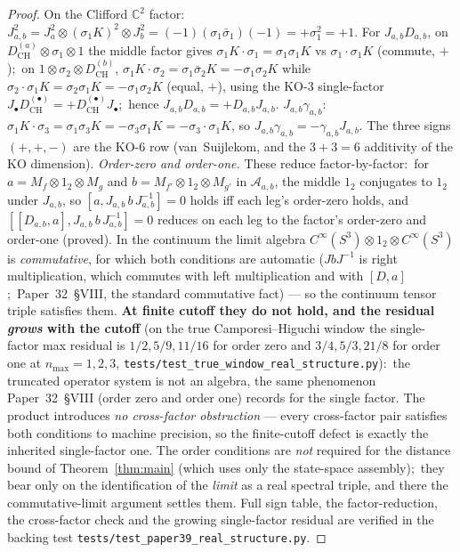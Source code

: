 \documentclass[11pt,a4paper]{article}
\theoremstyle{plain}
\theoremstyle{definition}
\newcommand{\nmax}{n_{\max}}
\newcommand{\sthree}{S^{3}}
\newcommand{\Acal}{\mathcal{A}}
\newcommand{\C}{\mathbb{C}}
\newcommand{\Mat}{M}
\newcommand{\DCH}{D_{\mathrm{CH}}}
\begin{document}
\begin{proof}
On the Clifford $\C^2$ factor:\ $J_{a,b}^2 = J_a^2 \otimes (\sigma_1 K)^2
\otimes J_b^2 = (-1)(\sigma_1\bar\sigma_1)(-1) = +\sigma_1^2 = +1$. For
$J_{a,b}D_{a,b}$, on $\DCH^{(a)}\otimes\sigma_1\otimes 1$ the middle factor
gives $\sigma_1 K\cdot\sigma_1 = \sigma_1\sigma_1 K$ vs
$\sigma_1\cdot\sigma_1 K$ (commute, $+$);\ on
$1\otimes\sigma_2\otimes\DCH^{(b)}$, $\sigma_1 K\cdot\sigma_2 =
\sigma_1\bar\sigma_2 K = -\sigma_1\sigma_2 K$ while
$\sigma_2\cdot\sigma_1 K = \sigma_2\sigma_1 K = -\sigma_1\sigma_2 K$ (equal,
$+$), using the KO-$3$ single-factor $J_\bullet\DCH^{(\bullet)} =
+\DCH^{(\bullet)}J_\bullet$;\ hence $J_{a,b}D_{a,b} = +D_{a,b}J_{a,b}$.
$J_{a,b}\gamma_{a,b}$:\ $\sigma_1 K\cdot\sigma_3 = \sigma_1\sigma_3 K =
-\sigma_3\sigma_1 K = -\sigma_3\cdot\sigma_1 K$, so
$J_{a,b}\gamma_{a,b} = -\gamma_{a,b}J_{a,b}$. The three signs $(+,+,-)$ are
the KO-$6$ row (van~Suijlekom, and the $3+3=6$ additivity of the KO
dimension). \emph{Order-zero and order-one.} These reduce factor-by-factor:\ for
$a = \Mat_f \otimes 1_2 \otimes \Mat_g$ and $b = \Mat_{f'} \otimes 1_2
\otimes \Mat_{g'}$ in $\Acal_{a,b}$, the middle $1_2$ conjugates to $1_2$
under $J_{a,b}$, so $[a, J_{a,b}\,b\,J_{a,b}^{-1}] = 0$ holds iff each leg's
order-zero holds, and $[[D_{a,b}, a], J_{a,b}\,b\,J_{a,b}^{-1}] = 0$ reduces
on each leg to the factor's order-zero and order-one (proved). In the
continuum the limit algebra $C^\infty(\sthree) \otimes 1_2 \otimes
C^\infty(\sthree)$ is \emph{commutative}, for which both conditions are
automatic ($J b J^{-1}$ is right multiplication, which commutes with left
multiplication and with $[D,a]$;\ Paper~32~\S VIII, the standard commutative
fact) --- so the continuum tensor triple satisfies them. \textbf{At finite
cutoff they do not hold, and the residual \emph{grows} with the cutoff}
(on the true Camporesi--Higuchi window the single-factor max residual is
$1/2, 5/9, 11/16$ for order zero and $3/4, 5/3, 21/8$ for order one at
$\nmax = 1, 2, 3$, \texttt{tests/test\_true\_window\_real\_structure.py}):\
the truncated operator system is not an
algebra, the same phenomenon Paper~32~\S VIII (order zero and order one)
records for the single factor. The product introduces \emph{no cross-factor
obstruction} --- every cross-factor pair satisfies both conditions to machine
precision, so the finite-cutoff defect is exactly the inherited single-factor
one. The order conditions are \emph{not} required for the distance bound of
Theorem~\ref{thm:main} (which uses only the state-space assembly);\ they bear
only on the identification of the \emph{limit} as a real spectral triple, and
there the commutative-limit argument settles them. Full sign table, the
factor-reduction, the cross-factor check and the growing single-factor
residual are verified in the backing test
\texttt{tests/test\_paper39\_real\_structure.py}.
\end{proof}
\end{document}
